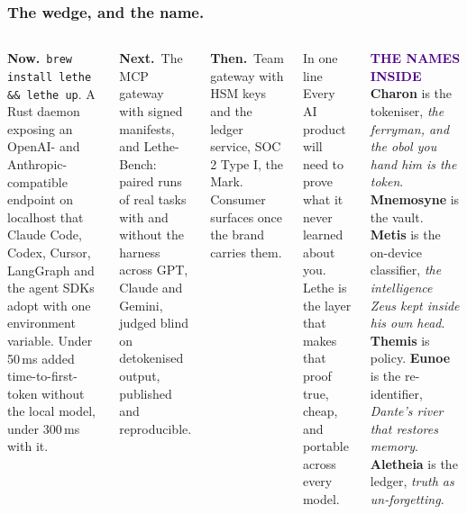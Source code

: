 \documentclass[aspectratio=169,10pt]{beamer}
\newcommand{\eyebrow}[1]{{\fontsize{6}{7.5}\selectfont\bfseries\textcolor{indigo}{\MakeUppercase{#1}}}}
\newcommand{\slideeyebrow}{}
\newcommand{\slide}[2]{\renewcommand{\slideeyebrow}{#1}\frametitle{#2}}
\newcommand{\para}[1]{\vspace{2pt}\textbf{#1}\ }
\begin{document}
\begin{frame}[shrink=20]
\slide{12 · 13}{The wedge, and the name.}
\begin{columns}[T]
\para{Now.}\texttt{brew install lethe \&\& lethe up}. A Rust daemon exposing an OpenAI- and Anthropic-compatible endpoint on localhost that Claude Code, Codex, Cursor, LangGraph and the agent SDKs adopt with one environment variable. Under 50\,ms added time-to-first-token without the local model, under 300\,ms with it.

\para{Next.}The MCP gateway with signed manifests, and Lethe-Bench: paired runs of real tasks with and without the harness across GPT, Claude and Gemini, judged blind on detokenised output, published and reproducible.

\para{Then.}Team gateway with HSM keys and the ledger service, SOC 2 Type I, the Mark. Consumer surfaces once the brand carries them.
\begin{callout}{In one line}
Every AI product will need to prove what it never learned about you. Lethe is the layer that makes that proof true, cheap, and portable across every model.
\end{callout}
\vspace{2mm}
\eyebrow{The names inside}\\[2pt]
{\footnotesize \textbf{Charon} is the tokeniser, \emph{the ferryman, and the obol you hand him is the token}. \textbf{Mnemosyne} is the vault. \textbf{Metis} is the on-device classifier, \emph{the intelligence Zeus kept inside his own head}. \textbf{Themis} is policy. \textbf{Eunoe} is the re-identifier, \emph{Dante's river that restores memory}. \textbf{Aletheia} is the ledger, \emph{truth as un-forgetting}.}
\end{columns}
\end{frame}
\end{document}

